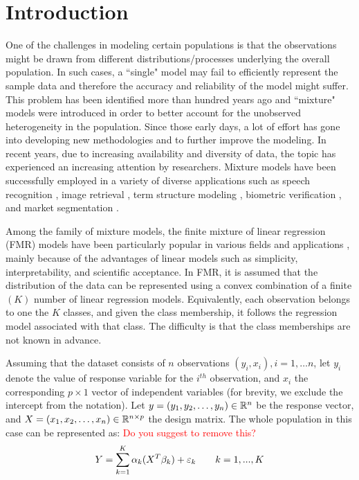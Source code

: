\documentclass[12pt]{article}
\begin{document}
\section{Introduction}
\label{sec:intro}
One of the challenges in modeling certain populations is that the  observations might be drawn from different distributions/processes underlying the overall population. In such cases, a ``single" model may fail to efficiently represent the sample data and therefore the accuracy and reliability of the model might suffer. This problem has been identified more than hundred years ago \citep{newcomb1886generalized, pearson1894contributions} and ``mixture" models were introduced in order to better account for the unobserved heterogeneity in the population. Since those early days, a lot of effort has gone into developing new methodologies and to further improve the modeling. In recent years, due to increasing  availability and diversity of data, the topic has experienced an increasing attention by researchers. Mixture models have been successfully employed in a variety of diverse applications such as speech recognition \citep{reynolds1995robust}, image retrieval \citep{permuter2003gaussian}, term structure modeling \citep{lemke2006term}, biometric verification \citep{stylianou2005gmm}, and market segmentation \citep{tuma2013finite}.

Among the family of mixture models, the finite mixture of linear regression (FMR) models have been particularly popular in various fields and applications 
\citep{bierbrauer2004modeling, andrews2003retention, bar1978tracking}, mainly because of the advantages of linear models such as simplicity,  interpretability, and scientific acceptance.  In FMR, it is assumed that the distribution of the data can be represented using a convex combination of a finite $(K)$ number of linear regression models. Equivalently, each observation belongs to one the $K$ classes, and given the class membership, it follows the regression model associated with that class. The difficulty is that the class memberships are not known in advance. 

Assuming that the dataset consists of $n$ observations $(y_i,x_i), i=1,\dots n$, let $y_i$ denote the value of response variable for the $i^{th}$ observation, and $x_i$ the corresponding $p \times 1$ vector of independent variables (for brevity, we exclude the intercept from the notation).
Let $y = (y_1, y_2, \dots, y_n) \in \mathbb{R}^n$ be the response vector, and $X= (x_1, x_2, \dots, x_n) \in \mathbb{R}^{n \times p}$ the design matrix.
The whole population in this case can be represented as: 
\textcolor{red}{Do you suggest to remove this?}
%
\begin{align}
Y = \sum_{k=1}^{K} \alpha_k (X^{T} \beta_k)+\varepsilon_k \qquad  k =1,...,K
\end{align}
\end{document}

